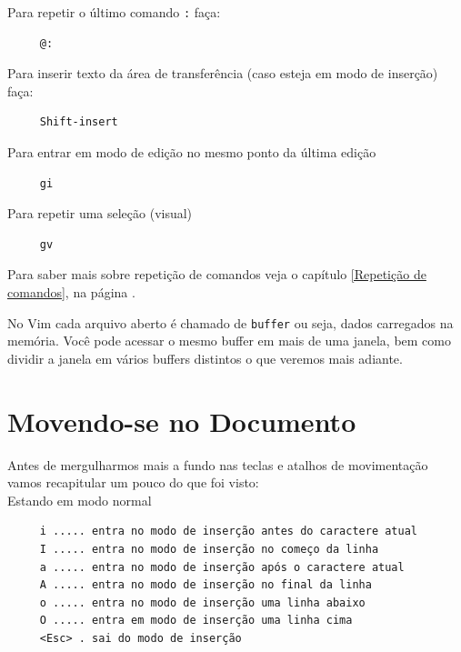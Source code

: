 \documentclass[10pt,a4paper,openany]{book}
\begin{document}
Para repetir o último comando \verb+:+ faça:

\begin{verbatim}
     @:
\end{verbatim}

Para inserir texto da área de transferência (caso esteja em modo de inserção) faça:

\begin{verbatim}
     Shift-insert
\end{verbatim}

Para entrar em modo de edição no mesmo ponto da última edição

\begin{verbatim}
     gi
\end{verbatim}

Para repetir uma seleção (visual)

\begin{verbatim}
     gv
\end{verbatim}

Para saber mais sobre repetição de comandos veja o capítulo \ref{Repetição de comandos},
na página \pageref{Repetição de comandos}.

No Vim cada arquivo aberto é chamado de \verb|buffer| ou seja, dados
carregados na memória. Você pode acessar o mesmo buffer em mais de uma
janela, bem como dividir a janela em vários buffers distintos o que veremos
mais adiante.

\chapter{Movendo-se no Documento}\label{cha:Movendo-se no Documento}

Antes de mergulharmos mais a fundo nas teclas e atalhos de
movimentação vamos recapitular um pouco do que foi visto: \\



Estando em modo normal

\begin{verbatim}
     i ..... entra no modo de inserção antes do caractere atual
     I ..... entra no modo de inserção no começo da linha
     a ..... entra no modo de inserção após o caractere atual
     A ..... entra no modo de inserção no final da linha
     o ..... entra no modo de inserção uma linha abaixo
     O ..... entra em modo de inserção uma linha cima
     <Esc> . sai do modo de inserção
\end{verbatim}
\end{document}
